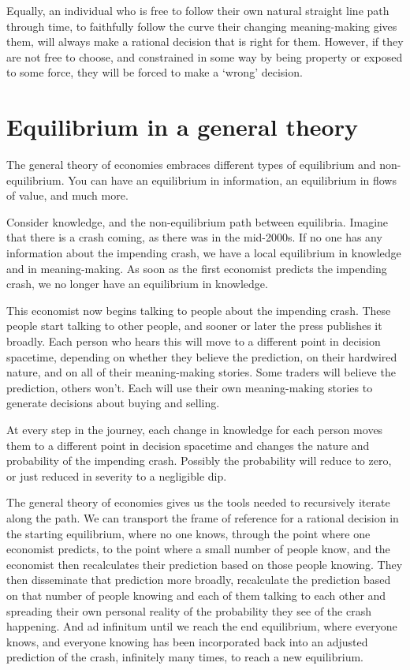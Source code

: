 Equally, an individual who is free to follow their own natural straight line path through time, to faithfully follow the curve their changing meaning\hyp{}making gives them, will always make a rational decision that is right for them. However, if they are not free to choose, and constrained in some way by being property or exposed to some force, they will be forced to make a ‘wrong’ decision.


\section*{Equilibrium in a general theory}
The general theory of economies  embraces different types of equilibrium and non\hyp{}equilibrium. You can have an equilibrium in information, an equilibrium in flows of value, and much more.


Consider knowledge, and the non\hyp{}equilibrium path between equilibria. Imagine that there is a crash coming, as there was in the mid\hyp{}2000s. If no one has any information about the impending crash, we have a local equilibrium in knowledge and in meaning\hyp{}making. As soon as the first economist predicts the impending crash, we no longer have an equilibrium in knowledge.


This economist now begins talking to people about the impending crash. These people start talking to other people, and sooner or later the press publishes it broadly. Each person who hears this will move to a different point in decision spacetime, depending on whether they believe the prediction, on their hardwired nature, and on all of their meaning\hyp{}making stories. Some traders will believe the prediction, others won’t. Each will use their own meaning\hyp{}making stories to generate decisions about buying and selling.


At every step in the journey, each change in knowledge for each person moves them to a different point in decision spacetime and changes the nature and probability of the impending crash. Possibly the probability will reduce to zero, or just reduced in severity to a negligible dip.


The general theory of economies gives us the tools needed to recursively iterate along the path. We can transport the frame of reference  for a rational decision in the starting equilibrium, where no one knows, through the point where one economist predicts, to the point where a small number of people know, and the economist then recalculates their prediction based on those people knowing. They then disseminate that prediction more broadly, recalculate the prediction based on that number of people knowing and each of them talking to each other and spreading their own personal reality of the probability they see of the crash happening. And ad infinitum until we reach the end equilibrium, where everyone knows, and everyone knowing has been incorporated back into an adjusted prediction of the crash, infinitely many times, to reach a new equilibrium.


